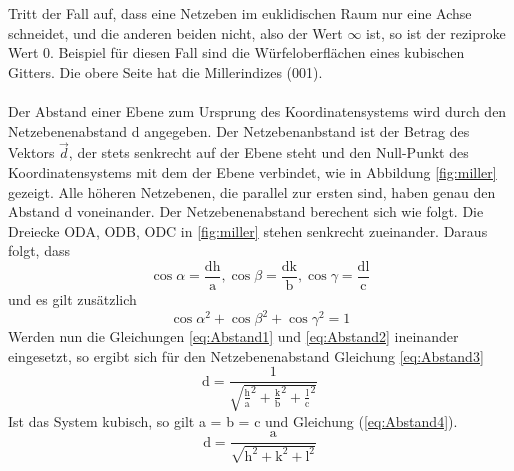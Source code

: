 Tritt der Fall auf, dass eine Netzeben im euklidischen Raum nur eine Achse schneidet, und die anderen beiden nicht, also der Wert $\infty$ ist, so ist der reziproke Wert 0. 
Beispiel für diesen Fall sind die Würfeloberflächen eines kubischen Gitters. 
Die obere Seite hat die Millerindizes (001).\\\\
Der Abstand einer Ebene zum Ursprung des Koordinatensystems wird durch den Netzebenenabstand d angegeben.
Der Netzebenanbstand ist der Betrag des Vektors $\vec{d}$, der stets senkrecht auf der Ebene steht und den Null-Punkt des Koordinatensystems mit dem der Ebene verbindet, wie in Abbildung \ref{fig:miller} gezeigt.
Alle höheren Netzebenen, die parallel zur ersten sind, haben genau den Abstand d voneinander.
Der Netzebenenabstand berechent sich wie folgt.
Die Dreiecke ODA, ODB, ODC in \ref{fig:miller} stehen senkrecht zueinander. Daraus folgt, dass
\begin{equation}
\cos{\alpha} = \frac{\text{d}\text{h}}{\text{a}}, \cos{\beta} = \frac{\text{d}\text{k}}{\text{b}}, \cos{\gamma} = \frac{\text{d}\text{l}}{\text{c}}
\label{eq:Abstand1}
\end{equation}
 und es gilt zusätzlich
\begin{equation}
\cos{\alpha}^2+\cos{\beta}^2+\cos{\gamma}^2 = 1
\label{eq:Abstand2}
\end{equation}
Werden nun die Gleichungen \ref{eq:Abstand1} und \ref{eq:Abstand2} ineinander eingesetzt, so ergibt sich für den Netzebenenabstand Gleichung \ref{eq:Abstand3}
\begin{equation}
\text{d} = \frac{1}{\sqrt{\frac{\text{h}}{\text{a}}^2+\frac{\text{k}}{\text{b}}^2+\frac{\text{l}}{\text{c}}^2}}
\label{eq:Abstand3}
\end{equation}
Ist das System kubisch, so gilt a = b = c und Gleichung (\ref{eq:Abstand4}).
\begin{equation}
\text{d} = \frac{\text{a}}{\sqrt{\text{h}^2+\text{k}^2+\text{l}^2}}
\label{eq:Abstand4}
\end{equation}


